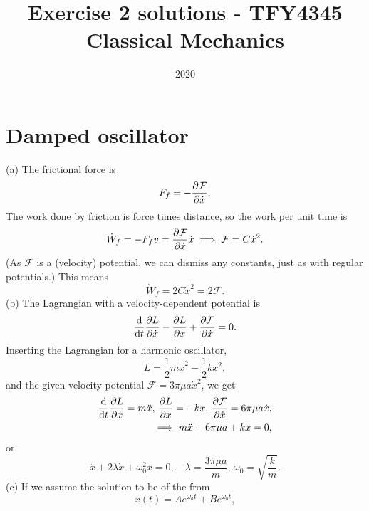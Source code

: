 \documentclass{article}
\title{Exercise 2 solutions - TFY4345 Classical Mechanics}
\date{2020}
\newcommand{\Eff}{\mathcal{F}}
\begin{document}
    \maketitle
    \section{Damped oscillator}
        (a) The frictional force is 
        \begin{equation*}
            F_f = -\pdv{\mathcal{F}}{\dot x}.
        \end{equation*}
        The work done by friction is force times distance, so the work per unit time is
        \begin{equation*}
            \dot W_f = - F_f v = \pdv{\mathcal{F}}{\dot x} \dot x \implies \mathcal{F} = C \dot x ^2.
        \end{equation*}
        (As $\mathcal{F}$ is a (velocity) potential, we can dismiss any constants, just as with regular potentials.) This means
        \begin{equation*}
            \dot W_f = 2 C \dot x^2 = 2 \mathcal{F}. 
        \end{equation*}
        (b) The Lagrangian with a velocity-dependent potential is 
        \begin{equation*}
            \dv{t} \pdv{L}{\dot x} - \pdv{L}{x} + \pdv{\Eff}{\dot x} = 0.
        \end{equation*}
        Inserting the Lagrangian for a harmonic oscillator, 
        \begin{equation*}
            L = \frac{1}{2} m \dot x^2 - \frac{1}{2} k x^2,
        \end{equation*}
        and the given velocity potential $\Eff = 3 \pi \mu a \dot x^2$, we get
        \begin{align*}
            \dv{t} \pdv{L}{\dot x} = m \ddot x, \, \pdv{L}{x} = -k x, \, \pdv{\Eff}{\dot x} = 6 \pi \mu a \dot x, \\
            \implies m \ddot x + 6 \pi \mu a + k x = 0,
        \end{align*}
        or
        \begin{equation*}
            \ddot x + 2 \lambda \dot x + \omega^2_0x = 0, \quad \lambda = \frac{3 \pi \mu a}{m}, \, \omega_0 = \sqrt{\frac{k}{m}}.
        \end{equation*}
        (c) 
        If we assume the solution to be of the from
        \begin{equation*}
            x(t) = A e^{\omega_a t} + B e^{\omega_b t},
        \end{equation*}
\end{document}

